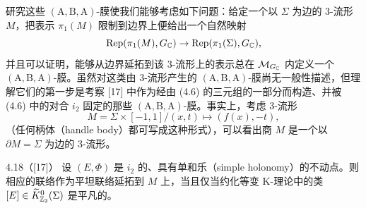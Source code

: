 研究这些 $(\mathrm{A},\mathrm{B},\mathrm{A})$-膜使我们能够考虑如下问题：给定一个以 $\Sigma$ 为边的 3-流形 $M$，把表示 $\pi_1(M)$ 限制到边界上便给出一个自然映射
\[
    \operatorname{Rep}(\pi_1(M),G_{\mathbb{C}}) \to \operatorname{Rep}(\pi_1(\Sigma),G_{\mathbb{C}}),
\]
并且可以证明，能够从边界延拓到该 3-流形上的表示总在 $\mathcal{M}_{G_{\mathbb{C}}}$ 内定义一个 $(\mathrm{A},\mathrm{B},\mathrm{A})$-膜。虽然对这类由 3-流形产生的 $(\mathrm{A},\mathrm{B},\mathrm{A})$-膜尚无一般性描述，但理解它们的第一步是考察 [17] 中作为经由 (4.6) 的三元组的一部分而构造、并被 (4.6) 中的对合 $i_2$ 固定的那些 $(\mathrm{A},\mathrm{B},\mathrm{A})$-膜。事实上，考虑 3-流形
\[
    M = \Sigma\times[-1,1]/(x,t)\mapsto(f(x),-t),
\]
（任何柄体（handle body）都可写成这种形式），可以看出商 $M$ 是一个以 $\partial M = \Sigma$ 为边的 3-流形。

\begin{thm}{4.18（[17]）} 设 $(E,\Phi)$ 是 $i_2$ 的、具有单和乐（simple holonomy）的不动点。则相应的联络作为平坦联络延拓到 $M$ 上，当且仅当约化等变 K-理论中的类 $[E] \in \widetilde{K}^0_{\mathbb{Z}_2}(\Sigma)$ 是平凡的。 \end{thm}
